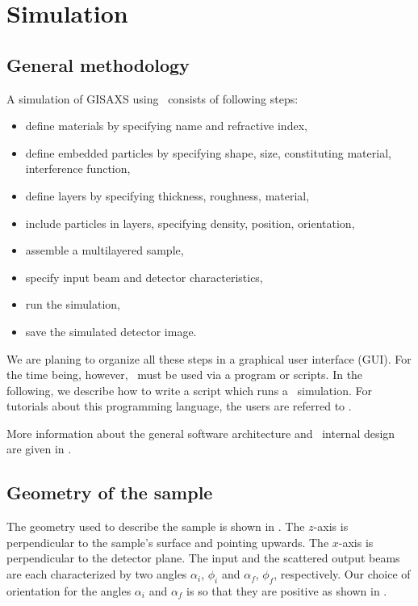 \newpage
\chapter{Simulation}  

\section{General methodology}
A simulation of GISAXS using \BornAgain\ consists of following steps:
\begin{itemize}
\item define materials by specifying name and refractive index,
\item define embedded particles by specifying shape, size,
   constituting material, interference function,
\item define layers by specifying thickness, roughness, material,
\item include particles in layers, specifying density, position, orientation, 
\item assemble a multilayered sample,
\item specify input beam and detector characteristics,
\item run the simulation,
\item save the simulated detector image.
\end{itemize}

\noindent
We are planing to organize all these steps in a graphical user interface (GUI).
For the time being, however, \BornAgain\ must be used via a  program or
 scripts. In the following, we describe how to write a 
 script which runs a \BornAgain\ simulation. For tutorials about this programming language, the users are referred to \cite{Lut09}.


More information about the general software architecture and \BornAgain\ internal design are given in .


\section{Geometry of the sample}

\noindent The geometry used to describe the sample is shown in . The $z$-axis is perpendicular to the sample's
surface and pointing upwards. The $x$-axis  is perpendicular to the
detector plane. The input and the
scattered output beams are each characterized by two angles
$\alpha_i$, $\phi_i$ and $\alpha_f$, $\phi_f$, respectively. Our choice of orientation for the
angles $\alpha_i$ and $\alpha_f$ is so that they are positive as shown in . \\

